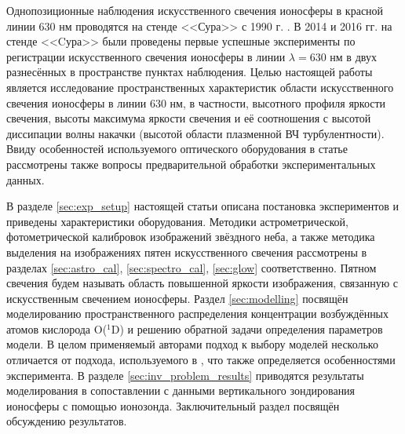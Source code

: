 \documentclass[12pt,a4paper]{article}
\begin{document}
Однопозиционные наблюдения искусственного свечения ионосферы в красной линии 630 нм проводятся на стенде <<Сура>> с 1990 г. \cite{BERNHARDTSCALESGRACHEtAl1991, BernhardtWongHubaEtAl2000, GrachKoschYashnovEtAl2007, Grach2012, Shindin2014, Klimenko2017}. 
В 2014 и 2016 гг. на стенде <<Cура>> были проведены первые успешные эксперименты по регистрации искусственного свечения ионосферы в линии $\lambda = 630$ нм в двух разнесённых в пространстве пунктах наблюдения.
Целью настоящей работы является исследование пространственных характеристик области искусственного свечения ионосферы в линии 630 нм, в частности, высотного профиля яркости свечения, высоты максимума яркости свечения и её соотношения с высотой диссипации волны накачки (высотой области плазменной ВЧ турбулентности).
Ввиду особенностей используемого оптического оборудования в статье рассмотрены также вопросы предварительной обработки экспериментальных данных.

В разделе \ref{sec:exp_setup} настоящей статьи описана постановка экспериментов и приведены характеристики оборудования. Методики астрометрической, фотометрической калибровок изображений звёздного неба, а также методика выделения на изображениях пятен искусственного свечения рассмотрены в разделах \ref{sec:astro_cal}, \ref{sec:spectro_cal}, \ref{sec:glow} соответственно. Пятном свечения будем называть область повышенной яркости изображения, связанную с искусственным свечением ионосферы.
Раздел \ref{sec:modelling} посвящён моделированию пространственного распределения концентрации возбуждённых атомов кислорода O($^1$D) и решению обратной задачи определения параметров модели. В целом применяемый авторами подход к выбору моделей несколько отличается от подхода, используемого в \cite{Gustavsson2001, Gustavsson2008}, что также определяется особенностями эксперимента. В разделе \ref{sec:inv_problem_results} приводятся результаты моделирования в сопоставлении с данными вертикального зондирования ионосферы с помощью ионозонда. Заключительный раздел посвящён обсуждению результатов.
\end{document}
